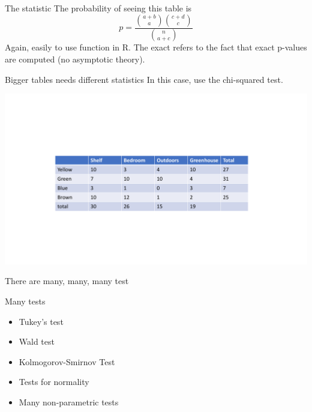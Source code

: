 \documentclass{bredelebeamer}
\begin{document}
\begin{frame}{The statistic}
The probability of seeing this table is
\begin{equation}
p = \frac{{a+ b \choose a} { c + d \choose c}}{{n \choose a + c}}
\end{equation}
Again, easily to use function in R. The exact refers to the fact that exact p-values are computed (no asymptotic theory).
\end{frame}

\begin{frame}{Bigger tables needs different statistics}
In this case, use the chi-squared test.

\includegraphics[width=1\textwidth]{chitable}
\end{frame}


\begin{frame}{There are many, many, many test}

\begin{block}{Many tests}
	
\begin{itemize}
\item Tukey's test
\item Wald test
\item Kolmogorov-Smirnov Test
\item Tests for normality
\item Many non-parametric tests
\end{itemize}

\end{block}

\end{frame}
\end{document}
